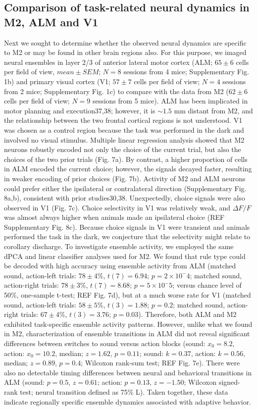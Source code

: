 \subsection{Comparison of task-related neural dynamics in M2, ALM and V1}
Next we sought to determine whether the observed neural dynamics are specific to M2 or may be found in other brain regions also. For this purpose, we imaged neural ensembles in layer 2/3 of anterior lateral motor cortex (ALM; $65 \pm 6$ cells per field of view, $mean \pm SEM$; $N = 8$ sessions from 4 mice; Supplementary Fig. 1b) and primary visual cortex (V1; $57 \pm 7$ cells per field of view; $N = 4$ sessions from 2 mice; Supplementary Fig. 1c) to compare with the data from M2 ($62 \pm 6$ cells per field of view; $N = 9$ sessions from 5 mice). ALM has been implicated in motor planning and execution37,38; however, it is $\sim 1.5$ mm distant from M2, and the relationship between the two frontal cortical regions is not understood. V1 was chosen as a control region because the task was performed in the dark and involved no visual stimulus. Multiple linear regression analysis showed that M2 neurons robustly encoded not only the choice of the current trial, but also the choices of the two prior trials (Fig. 7a). By contrast, a higher proportion of cells in ALM encoded the current choice; however, the signals decayed faster, resulting in weaker encoding of prior choices (Fig. 7b). Activity of M2 and ALM neurons could prefer either the ipsilateral or contralateral direction (Supplementary Fig. 8a,b), consistent with prior studies30,38. Unexpectedly, choice signals were also observed in V1 (Fig. 7c). Choice selectivity in V1 was relatively weak, and $\Delta F/F$ was almost always higher when animals made an ipsilateral choice (REF Supplementary Fig. 8c). Because choice signals in V1 were transient and animals performed the task in the dark, we conjecture that the selectivity might relate to corollary discharge. To investigate ensemble activity, we employed the same dPCA and linear classifier analyses used for M2. We found that rule type could be decoded with high accuracy using ensemble activity from ALM (matched sound, action-left trials: $78 \pm 4\%$, $t(7) = 6.94$; $p = 2 \times 10^-4$; matched sound, action-right trials: $78 \pm 3\%$, $t(7) = 8.68$; $p = 5 \times 10^-5$; versus chance level of 50\%, one-sample t-test; REF Fig. 7d), but at a much worse rate for V1 (matched sound, action-left trials: $58 \pm 5\%$, $t(3) = 1.88$; $p = 0.2$; matched sound, action-right trials: $67 \pm 4\%$, $t(3) = 3.76$; $p = 0.03$). Therefore, both ALM and M2 exhibited task-specific ensemble activity patterns. However, unlike what we found in M2, characterization of ensemble transitions in ALM did not reveal significant differences between switches to sound versus action blocks (sound: $x_0 = 8.2$, action: $x_0 = 10.2$, median; $z = 1.62$, $p = 0.11$; sound: $k = 0.37$, action: $k = 0.56$, median; $z = 0.89$, $p = 0.4$; Wilcoxon rank-sum test; REF Fig. 7e). There were also no detectable timing differences between neural and behavioral transitions in ALM (sound: $p = 0.5$, $z = 0.61$; action: $p = 0.13$, $z = -1.50$; Wilcoxon signed-rank test; neural transition defined as 75\% L). Taken together, these data indicate regionally specific ensemble dynamics associated with adaptive behavior.